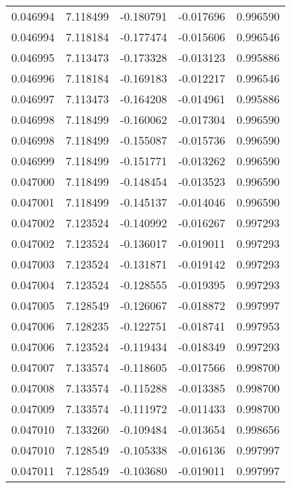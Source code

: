 \begin{tabular}{lrrrr}
0.046994    &  7.118499 & -0.180791 & -0.017696 &             0.996590 \\
0.046994    &  7.118184 & -0.177474 & -0.015606 &             0.996546 \\
0.046995    &  7.113473 & -0.173328 & -0.013123 &             0.995886 \\
0.046996    &  7.118184 & -0.169183 & -0.012217 &             0.996546 \\
0.046997    &  7.113473 & -0.164208 & -0.014961 &             0.995886 \\
0.046998    &  7.118499 & -0.160062 & -0.017304 &             0.996590 \\
0.046998    &  7.118499 & -0.155087 & -0.015736 &             0.996590 \\
0.046999    &  7.118499 & -0.151771 & -0.013262 &             0.996590 \\
0.047000    &  7.118499 & -0.148454 & -0.013523 &             0.996590 \\
0.047001    &  7.118499 & -0.145137 & -0.014046 &             0.996590 \\
0.047002    &  7.123524 & -0.140992 & -0.016267 &             0.997293 \\
0.047002    &  7.123524 & -0.136017 & -0.019011 &             0.997293 \\
0.047003    &  7.123524 & -0.131871 & -0.019142 &             0.997293 \\
0.047004    &  7.123524 & -0.128555 & -0.019395 &             0.997293 \\
0.047005    &  7.128549 & -0.126067 & -0.018872 &             0.997997 \\
0.047006    &  7.128235 & -0.122751 & -0.018741 &             0.997953 \\
0.047006    &  7.123524 & -0.119434 & -0.018349 &             0.997293 \\
0.047007    &  7.133574 & -0.118605 & -0.017566 &             0.998700 \\
0.047008    &  7.133574 & -0.115288 & -0.013385 &             0.998700 \\
0.047009    &  7.133574 & -0.111972 & -0.011433 &             0.998700 \\
0.047010    &  7.133260 & -0.109484 & -0.013654 &             0.998656 \\
0.047010    &  7.128549 & -0.105338 & -0.016136 &             0.997997 \\
0.047011    &  7.128549 & -0.103680 & -0.019011 &             0.997997 \\

\end{tabular}
